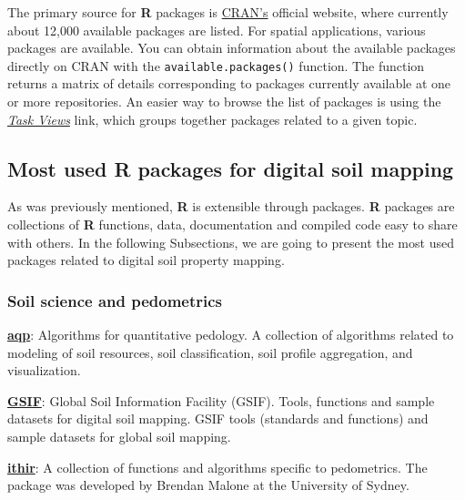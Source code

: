 \documentclass[10pt,b5paper,]{book}
\theoremstyle{definition}
\theoremstyle{definition}
\theoremstyle{definition}
\theoremstyle{remark}
\begin{document}
The primary source for \textbf{R} packages is
\href{https://cran.r-project.org/}{CRAN's} official website, where
currently about 12,000 available packages are listed. For spatial
applications, various packages are available. You can obtain information
about the available packages directly on CRAN with the
\texttt{available.packages()} function. The function returns a matrix of
details corresponding to packages currently available at one or more
repositories. An easier way to browse the list of packages is using the
\href{https://cran.r-project.org/web/views/}{\emph{Task Views}} link,
which groups together packages related to a given topic.

\hypertarget{most-used-r-packages-for-digital-soil-mapping}{%
\subsection{Most used R packages for digital soil
mapping}\label{most-used-r-packages-for-digital-soil-mapping}}

As was previously mentioned, \textbf{R} is extensible through packages.
\textbf{R} packages are collections of \textbf{R} functions, data,
documentation and compiled code easy to share with others. In the
following Subsections, we are going to present the most used packages
related to digital soil property mapping.

\hypertarget{SoilPedometrics}{%
\subsubsection{Soil science and pedometrics}\label{SoilPedometrics}}

\href{https://CRAN.R-project.org/package=aqp}{\textbf{aqp}}: Algorithms
for quantitative pedology. A collection of algorithms related to
modeling of soil resources, soil classification, soil profile
aggregation, and visualization.

\href{https://CRAN.R-project.org/package=GSIF}{\textbf{GSIF}}: Global
Soil Information Facility (GSIF). Tools, functions and sample datasets
for digital soil mapping. GSIF tools (standards and functions) and
sample datasets for global soil mapping.

\href{http://ithir.r-forge.r-project.org/}{\textbf{ithir}}: A collection
of functions and algorithms specific to pedometrics. The package was
developed by Brendan Malone at the University of Sydney.
\end{document}
